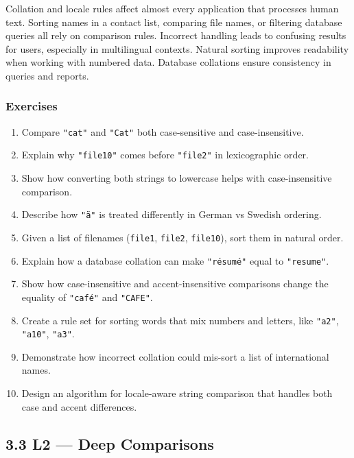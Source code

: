 \documentclass[
  letterpaper,
  DIV=11,
  numbers=noendperiod]{scrreprt}
\providecommand{\tightlist}{%
  \setlength{\itemsep}{0pt}\setlength{\parskip}{0pt}}
\begin{document}
Collation and locale rules affect almost every application that
processes human text. Sorting names in a contact list, comparing file
names, or filtering database queries all rely on comparison rules.
Incorrect handling leads to confusing results for users, especially in
multilingual contexts. Natural sorting improves readability when working
with numbered data. Database collations ensure consistency in queries
and reports.

\subsubsection{Exercises}\label{exercises-36}

\begin{enumerate}
\def\labelenumi{\arabic{enumi}.}
\tightlist
\item
  Compare \texttt{"cat"} and \texttt{"Cat"} both case-sensitive and
  case-insensitive.
\item
  Explain why \texttt{"file10"} comes before \texttt{"file2"} in
  lexicographic order.
\item
  Show how converting both strings to lowercase helps with
  case-insensitive comparison.
\item
  Describe how \texttt{"ä"} is treated differently in German vs Swedish
  ordering.
\item
  Given a list of filenames (\texttt{file1}, \texttt{file2},
  \texttt{file10}), sort them in natural order.
\item
  Explain how a database collation can make \texttt{"résumé"} equal to
  \texttt{"resume"}.
\item
  Show how case-insensitive and accent-insensitive comparisons change
  the equality of \texttt{"café"} and \texttt{"CAFE"}.
\item
  Create a rule set for sorting words that mix numbers and letters, like
  \texttt{"a2"}, \texttt{"a10"}, \texttt{"a3"}.
\item
  Demonstrate how incorrect collation could mis-sort a list of
  international names.
\item
  Design an algorithm for locale-aware string comparison that handles
  both case and accent differences.
\end{enumerate}

\subsection{3.3 L2 --- Deep Comparisons}\label{l2-deep-comparisons}
\end{document}
